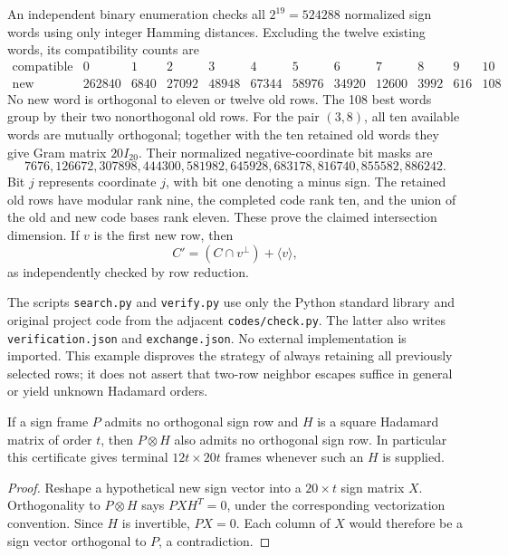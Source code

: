 An independent binary enumeration checks all $2^{19}=524288$
normalized sign words using only integer Hamming distances. Excluding
the twelve existing words, its compatibility counts are
\[
\begin{array}{c|rrrrrrrrrrr}
\text{compatible}&0&1&2&3&4&5&6&7&8&9&10\\\hline
\text{new classes}&262840&6840&27092&48948&67344&58976&34920&12600&3992&616&108
\end{array}
\]
No new word is orthogonal to eleven or twelve old rows. The 108
best words group by their two nonorthogonal old rows. For the pair
$(3,8)$, all ten available words are mutually orthogonal; together
with the ten retained old words they give Gram matrix $20I_{20}$.
Their normalized negative-coordinate bit masks are
\[
7676,126672,307898,444300,581982,645928,683178,816740,855582,886242.
\]
Bit $j$ represents coordinate $j$, with bit one denoting a minus sign.
The retained old rows have modular rank nine, the completed code
rank ten, and the union of the old and new code bases rank eleven.
These prove the claimed intersection dimension. If $v$ is the first
new row, then
\[
 C'=(C\cap v^\perp)+\langle v\rangle,
\]
as independently checked by row reduction.

The scripts \texttt{search.py} and \texttt{verify.py} use only the
Python standard library and original project code from the adjacent
\texttt{codes/check.py}. The latter also writes
\texttt{verification.json} and \texttt{exchange.json}. No external
implementation is imported. This example disproves the strategy of
always retaining all previously selected rows; it does not assert
that two-row neighbor escapes suffice in general or yield unknown
Hadamard orders.

\begin{theorem}
If a sign frame $P$ admits no orthogonal sign row and $H$ is a square
Hadamard matrix of order $t$, then $P\otimes H$ also admits no
orthogonal sign row. In particular this certificate gives terminal
$12t\times20t$ frames whenever such an $H$ is supplied.
\end{theorem}
\begin{proof}
Reshape a hypothetical new sign vector into a $20\times t$ sign
matrix $X$. Orthogonality to $P\otimes H$ says $PXH^T=0$, under
the corresponding vectorization convention. Since $H$ is invertible,
$PX=0$. Each column of $X$ would therefore be a sign vector
orthogonal to $P$, a contradiction.
\end{proof}

